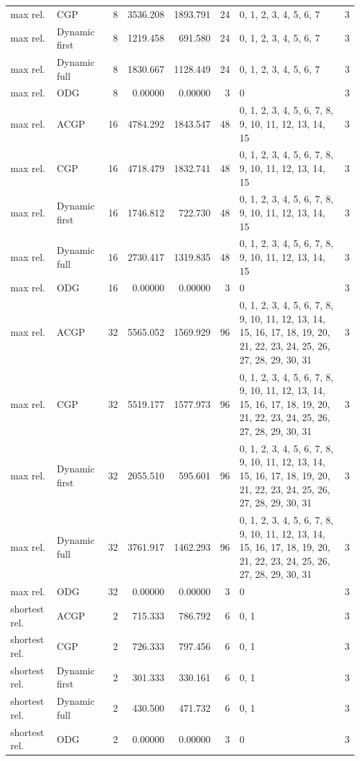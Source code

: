 \documentclass[10pt,a4paper]{article}
\begin{document}
\begin{longtable}{@{}p{23mm}p{29mm}rrrrp{36mm}r@{}}
max rel. & CGP & 8 & 3536.208 & 1893.791 & 24 & 0, 1, 2, 3, 4, 5, 6, 7 & 3 \\
max rel. & Dynamic first & 8 & 1219.458 & 691.580 & 24 & 0, 1, 2, 3, 4, 5, 6, 7 & 3 \\
max rel. & Dynamic full & 8 & 1830.667 & 1128.449 & 24 & 0, 1, 2, 3, 4, 5, 6, 7 & 3 \\
max rel. & ODG & 8 & 0.00000 & 0.00000 & 3 & 0 & 3 \\
max rel. & ACGP & 16 & 4784.292 & 1843.547 & 48 & 0, 1, 2, 3, 4, 5, 6, 7, 8, 9, 10, 11, 12, 13, 14, 15 & 3 \\
max rel. & CGP & 16 & 4718.479 & 1832.741 & 48 & 0, 1, 2, 3, 4, 5, 6, 7, 8, 9, 10, 11, 12, 13, 14, 15 & 3 \\
max rel. & Dynamic first & 16 & 1746.812 & 722.730 & 48 & 0, 1, 2, 3, 4, 5, 6, 7, 8, 9, 10, 11, 12, 13, 14, 15 & 3 \\
max rel. & Dynamic full & 16 & 2730.417 & 1319.835 & 48 & 0, 1, 2, 3, 4, 5, 6, 7, 8, 9, 10, 11, 12, 13, 14, 15 & 3 \\
max rel. & ODG & 16 & 0.00000 & 0.00000 & 3 & 0 & 3 \\
max rel. & ACGP & 32 & 5565.052 & 1569.929 & 96 & 0, 1, 2, 3, 4, 5, 6, 7, 8, 9, 10, 11, 12, 13, 14, 15, 16, 17, 18, 19, 20, 21, 22, 23, 24, 25, 26, 27, 28, 29, 30, 31 & 3 \\
max rel. & CGP & 32 & 5519.177 & 1577.973 & 96 & 0, 1, 2, 3, 4, 5, 6, 7, 8, 9, 10, 11, 12, 13, 14, 15, 16, 17, 18, 19, 20, 21, 22, 23, 24, 25, 26, 27, 28, 29, 30, 31 & 3 \\
max rel. & Dynamic first & 32 & 2055.510 & 595.601 & 96 & 0, 1, 2, 3, 4, 5, 6, 7, 8, 9, 10, 11, 12, 13, 14, 15, 16, 17, 18, 19, 20, 21, 22, 23, 24, 25, 26, 27, 28, 29, 30, 31 & 3 \\
max rel. & Dynamic full & 32 & 3761.917 & 1462.293 & 96 & 0, 1, 2, 3, 4, 5, 6, 7, 8, 9, 10, 11, 12, 13, 14, 15, 16, 17, 18, 19, 20, 21, 22, 23, 24, 25, 26, 27, 28, 29, 30, 31 & 3 \\
max rel. & ODG & 32 & 0.00000 & 0.00000 & 3 & 0 & 3 \\
shortest rel. & ACGP & 2 & 715.333 & 786.792 & 6 & 0, 1 & 3 \\
shortest rel. & CGP & 2 & 726.333 & 797.456 & 6 & 0, 1 & 3 \\
shortest rel. & Dynamic first & 2 & 301.333 & 330.161 & 6 & 0, 1 & 3 \\
shortest rel. & Dynamic full & 2 & 430.500 & 471.732 & 6 & 0, 1 & 3 \\
shortest rel. & ODG & 2 & 0.00000 & 0.00000 & 3 & 0 & 3 \\

\end{longtable}
\end{document}
